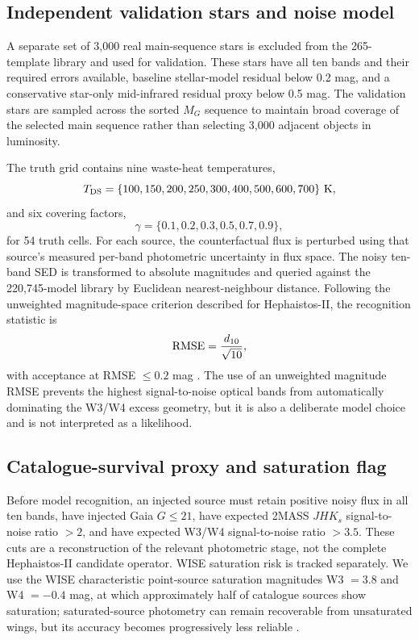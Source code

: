 \documentclass[fleqn,usenatbib]{mnras}
\begin{document}
\subsection{Independent validation stars and noise model}

A separate set of 3,000 real main-sequence stars is excluded from the 265-template library and used for validation. These stars have all ten bands and their required errors available, baseline stellar-model residual below 0.2 mag, and a conservative star-only mid-infrared residual proxy below 0.5 mag. The validation stars are sampled across the sorted $M_G$ sequence to maintain broad coverage of the selected main sequence rather than selecting 3,000 adjacent objects in luminosity.

The truth grid contains nine waste-heat temperatures,
\begin{equation}
T_{\rm DS}=\{100,150,200,250,300,400,500,600,700\}\ {\rm K},
\end{equation}
and six covering factors,
\begin{equation}
\gamma=\{0.1,0.2,0.3,0.5,0.7,0.9\},
\end{equation}
for 54 truth cells. For each source, the counterfactual flux is perturbed using that source's measured per-band photometric uncertainty in flux space. The noisy ten-band SED is transformed to absolute magnitudes and queried against the 220,745-model library by Euclidean nearest-neighbour distance. Following the unweighted magnitude-space criterion described for Hephaistos-II, the recognition statistic is
\begin{equation}
{\rm RMSE}=\frac{d_{10}}{\sqrt{10}},
\end{equation}
with acceptance at RMSE $\le0.2$ mag \citep{Suazo2024}. The use of an unweighted magnitude RMSE prevents the highest signal-to-noise optical bands from automatically dominating the W3/W4 excess geometry, but it is also a deliberate model choice and is not interpreted as a likelihood.

\subsection{Catalogue-survival proxy and saturation flag}

Before model recognition, an injected source must retain positive noisy flux in all ten bands, have injected Gaia $G\le21$, have expected 2MASS $JHK_s$ signal-to-noise ratio $>2$, and have expected W3/W4 signal-to-noise ratio $>3.5$. These cuts are a reconstruction of the relevant photometric stage, not the complete Hephaistos-II candidate operator. WISE saturation risk is tracked separately. We use the WISE characteristic point-source saturation magnitudes W3 $=3.8$ and W4 $=-0.4$ mag, at which approximately half of catalogue sources show saturation; saturated-source photometry can remain recoverable from unsaturated wings, but its accuracy becomes progressively less reliable \citep{Cutri2012}.
\end{document}
